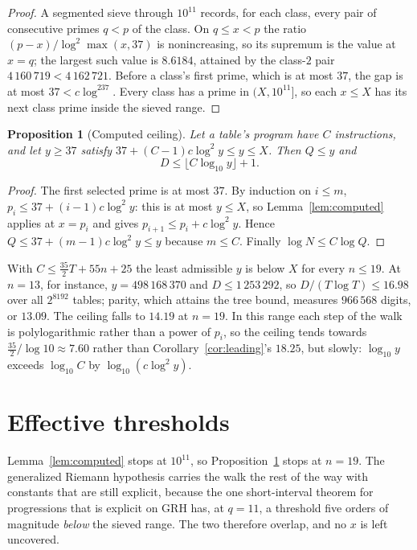 \documentclass[11pt]{article}
\newtheorem{proposition}[theorem]{Proposition}
\theoremstyle{remark}
\begin{document}
\begin{proof}
A segmented sieve through $10^{11}$ records, for each class, every pair of
consecutive primes $q<p$ of the class.  On $q\le x<p$ the ratio
$(p-x)/\log^2\max(x,37)$ is nonincreasing, so its supremum is the value at
$x=q$; the largest such value is $8.6184$, attained by the class-$2$ pair
$4\,160\,719<4\,162\,721$.  Before a class's first prime, which is at
most $37$, the gap is at most $37<c\log^237$.  Every class has a prime in
$(X,10^{11}]$, so each $x\le X$ has its next class prime inside the sieved
range.
\end{proof}

\begin{proposition}[Computed ceiling]\label{prop:computed}
Let a table's program have $C$ instructions, and let $y\ge37$ satisfy
$37+(C-1)c\log^2y\le y\le X$.  Then $Q\le y$ and
\[
  D\le\lfloor C\log_{10}y\rfloor+1.
\]
\end{proposition}

\begin{proof}
The first selected prime is at most $37$.  By induction on $i\le m$,
$p_i\le37+(i-1)c\log^2y$: this is at most $y\le X$, so
Lemma~\ref{lem:computed} applies at $x=p_i$ and gives
$p_{i+1}\le p_i+c\log^2y$.  Hence $Q\le37+(m-1)c\log^2y\le y$ because
$m\le C$.  Finally $\log N\le C\log Q$.
\end{proof}

With $C\le\frac{35}{2}T+55n+25$ the least admissible $y$ is below $X$ for
every $n\le19$.  At $n=13$, for instance, $y=498\,168\,370$ and
$D\le1\,253\,292$, so $D/(T\log T)\le16.98$ over all $2^{8192}$ tables;
parity, which attains the tree bound, measures $966\,568$ digits, or
$13.09$.  The ceiling falls to $14.19$ at $n=19$.  In this range each step
of the walk is polylogarithmic rather than a power of $p_i$, so the ceiling
tends towards $\frac{35}{2}/\log10\approx7.60$ rather than
Corollary~\ref{cor:leading}'s $18.25$, but slowly: $\log_{10}y$ exceeds
$\log_{10}C$ by $\log_{10}(c\log^2y)$.

\section{Effective thresholds}\label{sec:grh}

Lemma~\ref{lem:computed} stops at $10^{11}$, so Proposition~\ref{prop:computed}
stops at $n=19$.  The generalized Riemann hypothesis carries the walk the rest
of the way with constants that are still explicit, because the one
short-interval theorem for progressions that is explicit on GRH has, at
$q=11$, a threshold five orders of magnitude \emph{below} the sieved range.
The two therefore overlap, and no $x$ is left uncovered.
\end{document}
